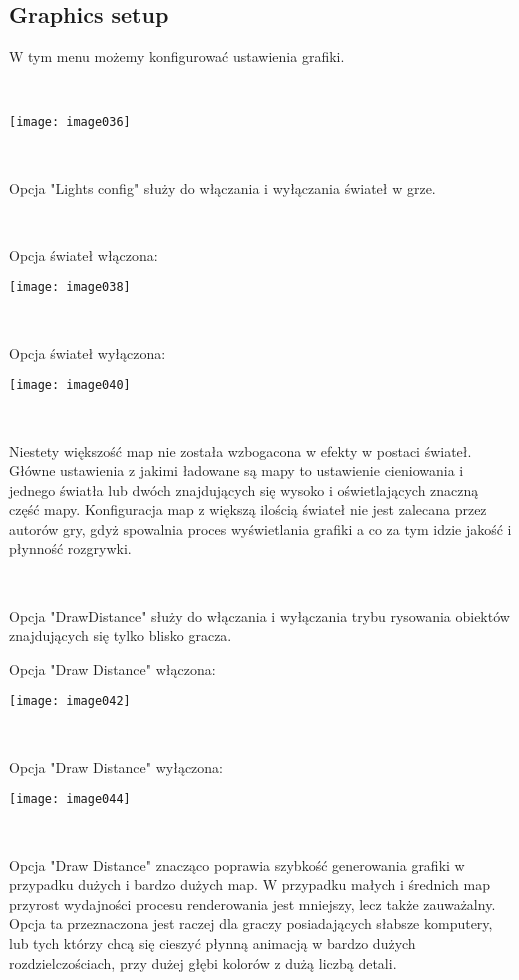 \documentclass[licencjacka]{pracamgr}
\begin{document}
\subsection{Graphics setup}

W tym menu możemy konfigurować ustawienia grafiki.

\begin{center}
\ \

\texttt{[image: image036]}
\end{center}

\ \

Opcja "Lights config" służy do włączania i wyłączania świateł w grze.

\begin{center}
\ \

Opcja świateł włączona:

\texttt{[image: image038]}

\ \

Opcja świateł wyłączona:

\texttt{[image: image040]}
\end{center}

\ \

Niestety większość map nie została wzbogacona w efekty w postaci świateł. Główne ustawienia z jakimi ładowane są mapy to ustawienie cieniowania i jednego światła lub dwóch znajdujących się wysoko i oświetlających znaczną część mapy. Konfiguracja map z większą ilością świateł nie jest zalecana przez autorów gry, gdyż spowalnia proces wyświetlania grafiki a co za tym idzie jakość i płynność rozgrywki.

\ \

Opcja "DrawDistance" służy do włączania i wyłączania trybu rysowania obiektów znajdujących się tylko blisko gracza.

\begin{center}
Opcja "Draw Distance" włączona:

\texttt{[image: image042]}

\ \

Opcja "Draw Distance" wyłączona:

\texttt{[image: image044]}
\end{center}

\ \

Opcja "Draw Distance" znacząco poprawia szybkość generowania grafiki w przypadku dużych i bardzo dużych map. W przypadku małych i średnich map przyrost wydajności procesu renderowania jest mniejszy, lecz także zauważalny.
Opcja ta przeznaczona jest raczej dla graczy posiadających słabsze komputery, lub tych którzy chcą się cieszyć płynną animacją w bardzo dużych rozdzielczościach, przy dużej głębi kolorów z dużą liczbą detali.
\end{document}

